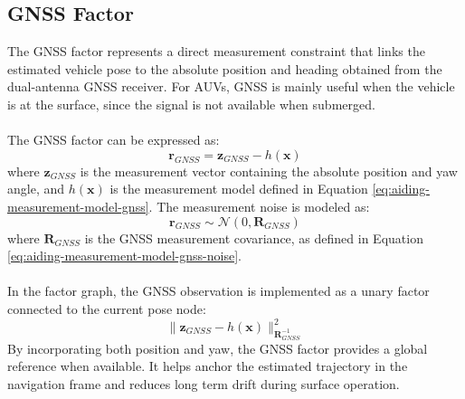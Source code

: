 \subsection{GNSS Factor}
The GNSS factor represents a direct measurement constraint that links the estimated vehicle pose to the absolute position and heading obtained from the dual-antenna GNSS receiver. For AUVs, GNSS is mainly useful when the vehicle is at the surface, since the signal is not available when submerged.
\\ \\
The GNSS factor can be expressed as:
$$
    \mathbf{r}_{GNSS} = \mathbf{z}_{GNSS} - h(\mathbf{x})
$$
where $\mathbf{z}_{GNSS}$ is the measurement vector containing the absolute position and yaw angle, and $h(\mathbf{x})$ is the measurement model defined in Equation \ref{eq:aiding-measurement-model-gnss}. The measurement noise is modeled as:
$$
    \mathbf{r}_{GNSS} \sim \mathcal{N}(0, \mathbf{R}_{GNSS})
$$
where $\mathbf{R}_{GNSS}$ is the GNSS measurement covariance, as defined in Equation \ref{eq:aiding-measurement-model-gnss-noise}.
\\ \\
In the factor graph, the GNSS observation is implemented as a unary factor connected to the current pose node:
$$
    \| \mathbf{z}_{GNSS} - h(\mathbf{x}) \|^2_{\mathbf{R}_{GNSS}^{-1}}
$$
By incorporating both position and yaw, the GNSS factor provides a global reference when available. It helps anchor the estimated trajectory in the navigation frame and reduces long term drift during surface operation.